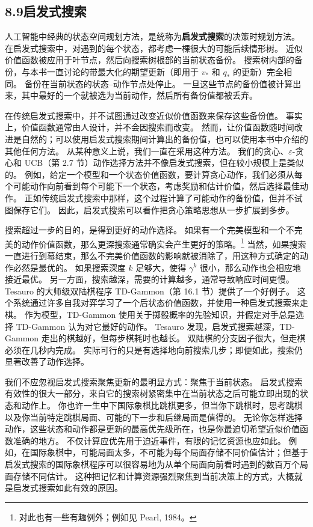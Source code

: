 \documentclass[UTF8, 12pt, fontset=fandol, oneside]{ctexart}
\begin{document}
\subsection*{8.9\quad 启发式搜索}

人工智能中经典的状态空间规划方法，是统称为\textbf{启发式搜索}的决策时规划方法。
在启发式搜索中，对遇到的每个状态，都考虑一棵很大的可能后续情形树。
近似价值函数被应用于叶节点，然后向搜索树根部的当前状态备份。
搜索树内部的备份，与本书一直讨论的带最大化的期望更新（即用于 $v_*$ 和 $q_*$ 的更新）完全相同。
备份在当前状态的状态--动作节点处停止。
一旦这些节点的备份值被计算出来，其中最好的一个就被选为当前动作，然后所有备份值都被丢弃。

在传统启发式搜索中，并不试图通过改变近似价值函数来保存这些备份值。
事实上，价值函数通常由人设计，并不会因搜索而改变。
然而，让价值函数随时间改进是自然的；可以使用启发式搜索期间计算出的备份值，也可以使用本书中介绍的其他任何方法。
从某种意义上说，我们一直在采用这种方法。
我们的贪心、$\varepsilon$-贪心和 UCB（第 2.7 节）动作选择方法并不像启发式搜索，但在较小规模上是类似的。
例如，给定一个模型和一个状态价值函数，要计算贪心动作，我们必须从每个可能动作向前看到每个可能下一个状态，考虑奖励和估计价值，然后选择最佳动作。
正如传统启发式搜索中那样，这个过程计算了可能动作的备份值，但并不试图保存它们。
因此，启发式搜索可以看作把贪心策略思想从一步扩展到多步。

搜索超过一步的目的，是得到更好的动作选择。
如果有一个完美模型和一个不完美的动作价值函数，那么更深搜索通常确实会产生更好的策略。\footnote{对此也有一些有趣例外；例如见 Pearl, 1984。}
当然，如果搜索一直进行到幕结束，那么不完美价值函数的影响就被消除了，用这种方式确定的动作必然是最优的。
如果搜索深度 $k$ 足够大，使得 $\gamma^k$ 很小，那么动作也会相应地接近最优。
另一方面，搜索越深，需要的计算越多，通常导致响应时间更慢。
Tesauro 的大师级双陆棋程序 TD-Gammon（第 16.1 节）提供了一个好例子。
这个系统通过许多自我对弈学习了一个后状态价值函数，并使用一种启发式搜索来走棋。
作为模型，TD-Gammon 使用关于掷骰概率的先验知识，并假定对手总是选择 TD-Gammon 认为对它最好的动作。
Tesauro 发现，启发式搜索越深，TD-Gammon 走出的棋越好，但每步棋耗时也越长。
双陆棋的分支因子很大，但走棋必须在几秒内完成。
实际可行的只是有选择地向前搜索几步；即便如此，搜索仍显著改善了动作选择。

我们不应忽视启发式搜索聚焦更新的最明显方式：聚焦于当前状态。
启发式搜索有效性的很大一部分，来自它的搜索树紧密集中在当前状态之后可能立即出现的状态和动作上。
你也许一生中下国际象棋比跳棋更多，但当你下跳棋时，思考跳棋以及你当前特定跳棋局面、可能的下一步和后继局面是值得的。
无论你怎样选择动作，这些状态和动作都是更新的最高优先级所在，也是你最迫切希望近似价值函数准确的地方。
不仅计算应优先用于迫近事件，有限的记忆资源也应如此。
例如，在国际象棋中，可能局面太多，不可能为每个局面存储不同价值估计；但基于启发式搜索的国际象棋程序可以很容易地为从单个局面向前看时遇到的数百万个局面存储不同估计。
这种把记忆和计算资源强烈聚焦到当前决策上的方式，大概就是启发式搜索如此有效的原因。
\end{document}
